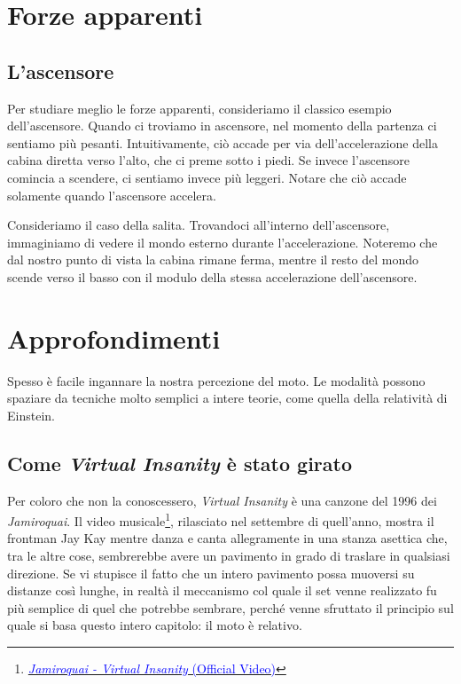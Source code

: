 \section{Forze apparenti}


\subsection{L'ascensore}
Per studiare meglio le forze apparenti, consideriamo il classico
esempio dell'ascensore. Quando ci troviamo in ascensore, nel
momento della partenza ci sentiamo più pesanti. Intuitivamente,
ciò accade per via dell'accelerazione della cabina diretta verso
l'alto, che ci preme sotto i piedi. Se invece l'ascensore comincia
a scendere, ci sentiamo invece più leggeri. Notare che ciò accade
solamente quando l'ascensore accelera.

Consideriamo il caso della salita. Trovandoci all'interno dell'ascensore,
immaginiamo di vedere il mondo esterno durante l'accelerazione. Noteremo
che dal nostro punto di vista la cabina rimane ferma, mentre il resto del
mondo scende verso il basso con il modulo della stessa accelerazione
dell'ascensore.


\section{Approfondimenti}
Spesso è facile ingannare la nostra percezione del moto. Le modalità
possono spaziare da tecniche molto semplici a intere teorie, come
quella della relatività di Einstein.

\subsection{Come \textit{Virtual Insanity} è stato girato}
Per coloro che non la conoscessero, \textit{Virtual Insanity} è
una canzone del 1996 dei \textit{Jamiroquai}. Il video
musicale\footnote{\href{https://www.youtube.com/watch?v=4JkIs37a2JE}{\textcolor{blue}{\textit{Jamiroquai - Virtual Insanity} (Official Video)}}},
rilasciato nel settembre di quell'anno, mostra il frontman Jay Kay
mentre danza e canta allegramente in una stanza asettica che, tra
le altre cose, sembrerebbe avere un pavimento in grado di traslare
in qualsiasi direzione. Se vi stupisce il fatto che un intero
pavimento possa muoversi su distanze così lunghe, in realtà il
meccanismo col quale il set venne realizzato fu più semplice di
quel che potrebbe sembrare, perché venne sfruttato il principio
sul quale si basa questo intero capitolo: il moto è relativo.

